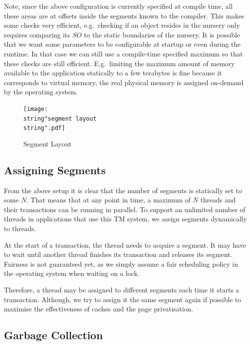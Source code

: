 \documentclass{sigplanconf}
\begin{document}
Note, since the above configuration is currently specified at compile time,
all these areas are at offsets inside the segments known to the
compiler. This makes some checks very efficient, e.g.\ checking
if an object resides in the nursery only requires comparing its $SO$
to the static boundaries of the nursery. It is possible that we want
some parameters to be configurable at startup or even during the
runtime. In that case we can still use a compile-time specified
maximum so that these checks are still efficient. E.g.\ limiting the
maximum amount of memory available to the application statically to a few
terabytes is fine because it corresponds to virtual memory,
the real physical memory is assigned on-demand by the operating
system.




\begin{figure}[t]
  \centering
  \texttt{[image: \\string"segment layout\\string".pdf]}
  \caption{Segment Layout\label{fig:Segment-Layout}}
\end{figure}



\subsection{Assigning Segments}

From the above setup it is clear that the number of segments is
statically set to some $N$. That means that at any point in time, a
maximum of $N$ threads and their transactions can be running in
parallel.  To support an unlimited number of threads in applications
that use this TM system, we assign segments dynamically to threads.

At the start of a transaction, the thread needs to acquire a
segment. It may have to wait until another thread finishes its
transaction and releases its segment. Fairness is not guaranteed yet, as
we simply assume a fair scheduling policy in the operating system when
waiting on a lock.

Therefore, a thread may be assigned to different segments each time it
starts a transaction. Although, we try to assign it the same segment
again if possible to maximise the effectiveness of caches and the
page privatisation.



\subsection{Garbage Collection}
\end{document}
